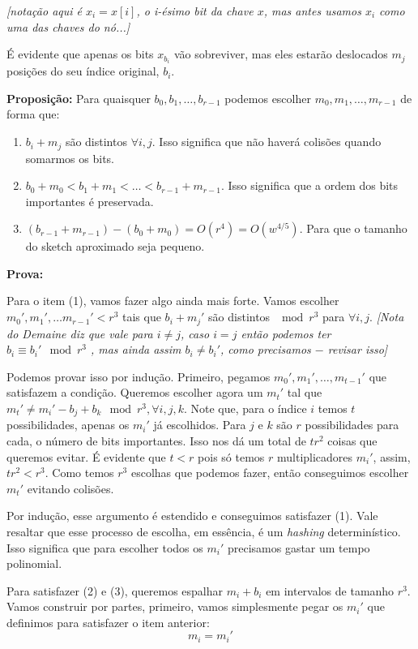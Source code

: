 \textit{[notação aqui é $x_i=x[i]$, o i-ésimo bit da chave $x$, mas antes usamos $x_i$ como uma das chaves do nó...]}

É evidente que apenas os bits $x_{b_i}$ vão sobreviver, mas eles estarão
deslocados $m_j$ posições do seu índice original, $b_i$.

\textbf{Proposição:} Para quaisquer $b_0,b_1,\dots,b_{r-1}$ podemos escolher
$m_0,m_1,\dots,m_{r-1}$ de forma que:
\begin{enumerate}[]
    \item $b_i+m_j$ são distintos $\forall i,j$. Isso significa que não haverá
    colisões quando somarmos os bits.
    \item $b_0+m_0<b_1+m_1<\dots<b_{r-1}+m_{r-1}$. Isso significa que a ordem
    dos bits importantes é preservada.
    \item $(b_{r-1}+m_{r-1})-(b_0+m_0)=O(r^4)=O(w^{4/5})$. Para que o tamanho do
    sketch aproximado seja pequeno. 
\end{enumerate}

\textbf{Prova:}

Para o item (1), vamos fazer algo ainda mais forte. Vamos escolher
$m_0',m_1',\dots m_{r-1}'<r^3$ tais que $b_i+m_j'$ são distintos $\mod r^3$ para
$\forall i,j$. \textit{[Nota do Demaine diz que vale para $i\neq j$, caso $i=j$
então podemos ter $b_i \equiv b_i' \mod r^3$ , mas ainda assim $b_i\neq b_i'$,
como precisamos $-$ revisar isso]}

Podemos provar isso por indução. Primeiro, pegamos $m_0',m_1',\dots,m_{t-1}'$
que satisfazem a condição. Queremos escolher agora um $m_t'$ tal que $m_t'\neq
m_i'-b_j+b_k \mod r^3, \forall i,j,k$. Note que, para o índice $i$ temos $t$
possibilidades, apenas os $m_i'$ já escolhidos. Para $j$ e $k$ são $r$
possibilidades para cada, o número de bits importantes. Isso nos dá um total de
$tr^2$ coisas que queremos evitar. É evidente que $t<r$ pois só temos $r$
multiplicadores $m_i'$, assim, $tr^2<r^3$. Como temos $r^3$ escolhas que podemos
fazer, então conseguimos escolher $m_t'$ evitando colisões.

Por indução, esse argumento é estendido e conseguimos satisfazer (1). Vale
resaltar que esse processo de escolha, em essência, é um \textit{hashing}
determinístico. Isso significa que para escolher todos os $m_i'$ precisamos
gastar um tempo polinomial. 

Para satisfazer (2) e (3), queremos espalhar $m_i+b_i$ em intervalos de tamanho
$r^3$. Vamos construir por partes, primeiro, vamos simplesmente pegar os $m_i'$
que definimos para satisfazer o item anterior:
\[
m_i = m_i'
\]

